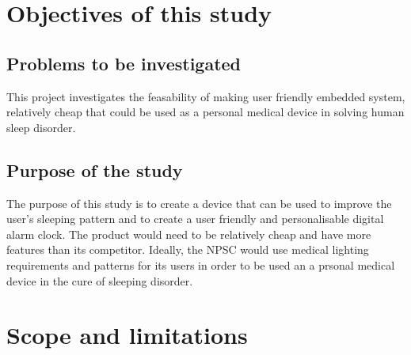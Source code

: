 \section{Objectives of this study}

\subsection{Problems to be investigated}
This project investigates the feasability of making user friendly embedded system, relatively cheap that could be used as a personal medical device in solving human sleep disorder.

\subsection{Purpose of the study}
The purpose of this study is to create a device that can be used to improve the user's sleeping pattern and to create a user friendly and personalisable digital alarm clock. The product would need to be relatively cheap and have more features than its competitor. Ideally, the NPSC would use medical lighting requirements and patterns for its users in order to be used an a prsonal medical device in the cure of sleeping disorder.  



\section{Scope and limitations}

